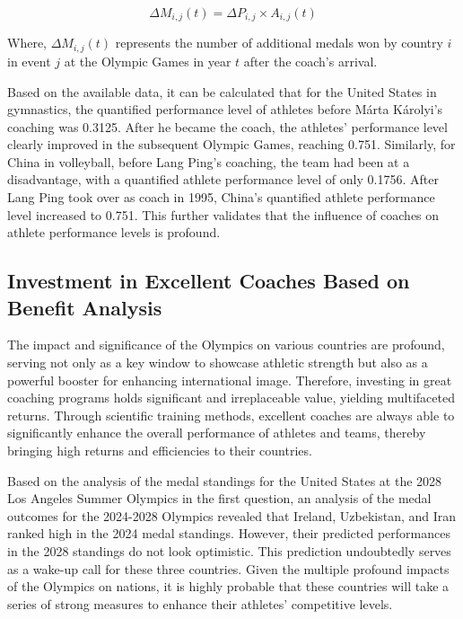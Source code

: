 \documentclass{mcmthesis}
\begin{document}
\begin{equation}
\Delta M_{i, j}(t) = \Delta P_{i, j} \times A_{i, j}(t)
\end{equation}

Where, $\Delta M_{i, j}(t)$ represents the number of additional medals won by country $i$ in event $j$ at the Olympic Games in year $t$ after the coach's arrival.

Based on the available data, it can be calculated that for the United States in gymnastics, the quantified performance level of athletes before Márta Károlyi's coaching was 0.3125. After he became the coach, the athletes' performance level clearly improved in the subsequent Olympic Games, reaching 0.751. Similarly, for China in volleyball, before Lang Ping's coaching, the team had been at a disadvantage, with a quantified athlete performance level of only 0.1756. After Lang Ping took over as coach in 1995, China's quantified athlete performance level increased to 0.751. This further validates that the influence of coaches on athlete performance levels is profound.

\subsection{Investment in Excellent Coaches Based on Benefit Analysis}
The impact and significance of the Olympics on various countries are profound, serving not only as a key window to showcase athletic strength but also as a powerful booster for enhancing international image. Therefore, investing in great coaching programs holds significant and irreplaceable value, yielding multifaceted returns. Through scientific training methods, excellent coaches are always able to significantly enhance the overall performance of athletes and teams, thereby bringing high returns and efficiencies to their countries.

Based on the analysis of the medal standings for the United States at the 2028 Los Angeles Summer Olympics in the first question, an analysis of the medal outcomes for the 2024-2028 Olympics revealed that Ireland, Uzbekistan, and Iran ranked high in the 2024 medal standings. However, their predicted performances in the 2028 standings do not look optimistic. This prediction undoubtedly serves as a wake-up call for these three countries. Given the multiple profound impacts of the Olympics on nations, it is highly probable that these countries will take a series of strong measures to enhance their athletes' competitive levels.
\end{document}
